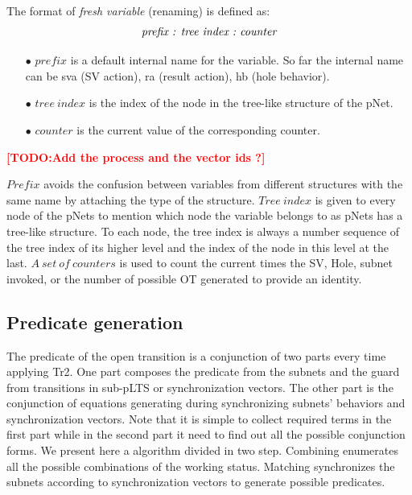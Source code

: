 \documentclass{lncs/llncs}
\newcommand{\TODO}[1]{\textcolor{red}{\textbf{[TODO:#1]}}}
\newcommand{\QIN}[1]{\textcolor{airforceblue}{#1}}
\begin{document}
\begin{definition}\label{fresh-variable}
The format of \emph{fresh variable} (renaming) is defined as:
$$\emph{prefix : tree\ index\ :\ counter}$$
\begin{itemize}
   \item[$\bullet$] $prefix$ is a default internal name for the variable. So far the internal name can be  sva (SV action), ra (result action), hb (hole behavior).
   \item[$\bullet$] $tree\ index$ is the index of the node in the tree-like structure of the pNet.
   \item[$\bullet$] $counter$ is the current value of the corresponding counter.
\end{itemize}
\end{definition}

\TODO{Add the process and the vector ids ?}

\QIN{
$Prefix$ avoids the confusion between variables from different structures with the same name by attaching the type of the structure. $Tree\ index$ is given to every node of the pNets to mention which node the variable belongs to as pNets has a tree-like structure. To each node, the tree index is always a number sequence of the tree index of its higher level and the index of the node in this level at the last. $A\ set\ of\ counters$ is used to count the current times the SV, Hole, subnet invoked, or the number of possible OT generated to provide an identity. 
}

\subsection{Predicate generation}
\QIN{
The predicate of the open transition is a conjunction of two parts every time applying Tr2. One part composes the predicate from the subnets and the guard from transitions in sub-pLTS or synchronization vectors. The other part is the conjunction of equations generating during  synchronizing subnets' behaviors and synchronization vectors. Note that it is simple to collect required terms in the first part while in the second part it need to find out all the possible conjunction forms. We present here a algorithm divided in two step. Combining enumerates all the possible combinations of the working status. Matching synchronizes the subnets according to synchronization vectors to generate possible predicates.
}
\end{document}

